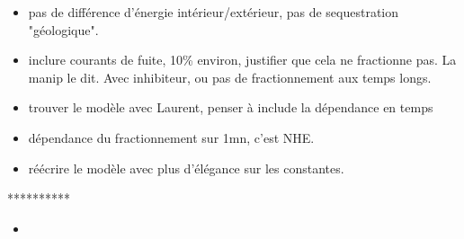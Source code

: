 \documentclass[aps,onecolumn]{revtex4}
\begin{document}
\begin{itemize}

\item pas de différence d'énergie intérieur/extérieur, pas de sequestration "géologique".

\item inclure courants de fuite, 10\% environ, justifier que cela ne fractionne pas. La manip le dit. Avec inhibiteur, ou pas de fractionnement aux temps longs.

\item trouver le modèle avec Laurent, penser à include la dépendance en temps 

\item dépendance du fractionnement sur 1mn, c'est NHE.
\item réécrire le modèle avec plus d'élégance sur les constantes.
\end{itemize}

\centerline{**********}

\begin{itemize}
\item
\end{itemize}
\end{document}
